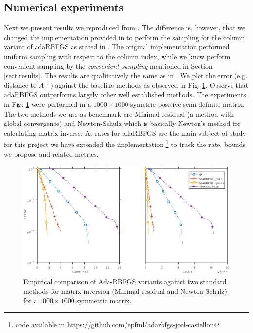 \documentclass[12pt,conference,compsocconf]{IEEEtran}
\begin{document}
\subsection{Numerical experiments}
Next we present results we reproduced from \cite{Gower1}. The difference is, however, that we changed the implementation provided in \cite{Gowercode} to perform the sampling for the column variant of adaRBFGS as stated in \cite{Gower1}. The original implementation performed uniform sampling with respect to the column index, while we know perform convenient sampling by the \textit{convenient sampling} mentioned in Section \ref{sect:results}. The results are qualitatively the same as in \cite{Gower1}. We plot the error (e.g. distance to $A^{-1}$) against the baseline methods as observed in Fig. \ref{fig:comparison}. Observe that adaRBFGS outperforms largely other well established methods. The experiments in Fig. \ref{fig:comparison} were performed in a $1000\times1000$ symetric positive semi definite matrix. The two methods we use as benchmark are Minimal residual (a method with global convergence) and Newton-Schulz which is basically Newton's method for calculating matrix inverse. As rates for adaRBFGS are the main subject of study for this project we have extended the implementation \footnote{code available in https://github.com/epfml/adarbfgs-joel-castellon} to track the rate, bounds we propose and related metrics.
\begin{figure}[H]
  \centering
  \includegraphics[height=0.7\columnwidth,width=1.1\columnwidth]{benchmark.eps}
  
  \vspace{-2mm}
  \caption{Empirical comparison of Ada-RBFGS variants against two standard methods for matrix inversion (Minimal residual and Newton-Schulz) for a $1000\times1000$ symmetric matrix.\label{fig:comparison}}  
  
\end{figure}
\end{document}
